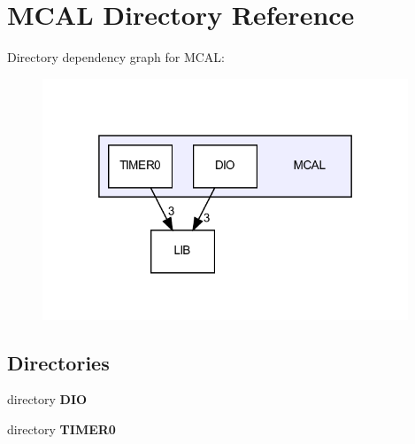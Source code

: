 \section{M\+C\+AL Directory Reference}
\label{dir_aeef58f5a946ad8e66cca46db86d7cf5}
Directory dependency graph for M\+C\+AL\+:
\nopagebreak
\begin{figure}[H]
\begin{center}
\leavevmode
\includegraphics[width=310pt]{dir_aeef58f5a946ad8e66cca46db86d7cf5_dep}
\end{center}
\end{figure}
\subsection*{Directories}
\begin{DoxyCompactItemize}
\item 
directory \textbf{ D\+IO}
\item 
directory \textbf{ T\+I\+M\+E\+R0}
\end{DoxyCompactItemize}
